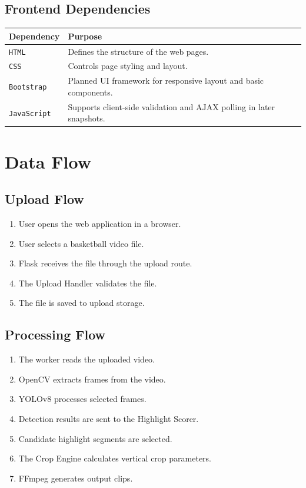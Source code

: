 \documentclass[12pt]{article}
\begin{document}
\subsection{Frontend Dependencies}

\begin{longtable}{|p{1.6in}|p{4.4in}|}
\hline
\textbf{Dependency} & \textbf{Purpose} \\
\hline
\texttt{HTML} & Defines the structure of the web pages. \\
\hline
\texttt{CSS} & Controls page styling and layout. \\
\hline
\texttt{Bootstrap} & Planned UI framework for responsive layout and basic components. \\
\hline
\texttt{JavaScript} & Supports client-side validation and AJAX polling in later snapshots. \\
\hline
\end{longtable}

\newpage

\section{Data Flow}

\subsection{Upload Flow}
\begin{enumerate}[noitemsep]
    \item User opens the web application in a browser.
    \item User selects a basketball video file.
    \item Flask receives the file through the upload route.
    \item The Upload Handler validates the file.
    \item The file is saved to upload storage.
\end{enumerate}

\subsection{Processing Flow}
\begin{enumerate}[noitemsep]
    \item The worker reads the uploaded video.
    \item OpenCV extracts frames from the video.
    \item YOLOv8 processes selected frames.
    \item Detection results are sent to the Highlight Scorer.
    \item Candidate highlight segments are selected.
    \item The Crop Engine calculates vertical crop parameters.
    \item FFmpeg generates output clips.
\end{enumerate}
\end{document}
